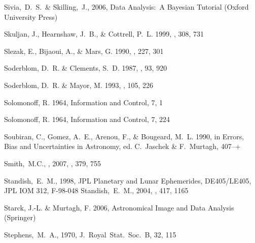 \begin{thebibliography}{99}
  Sivia,~D.~S.~\& Skilling,~J., 2006,
  Data Analysis:\ A Bayesian Tutorial (Oxford University Press)

{Skuljan}, J., {Hearnshaw}, J.~B., \& {Cottrell}, P.~L. 1999, \mnras, 308, 731

{Slezak}, E., {Bijaoui}, A., \& {Mars}, G. 1990, \aap, 227, 301

{Soderblom}, D.~R. \& {Clements}, S.~D. 1987, \aj, 93, 920

{Soderblom}, D.~R. \& {Mayor}, M. 1993, \aj, 105, 226

{Solomonoff}, R. 1964{}, {Information and Control}, 7, 1

{Solomonoff}, R. 1964{}, {Information and Control}, 7, 224

{Soubiran}, C., {Gomez}, A.~E., {Arenou}, F., \& {Bougeard}, M.~L. 1990, in
  Errors, Bias and Uncertainties in Astronomy, ed. C.~{Jaschek} \&
  F.~{Murtagh}, 407--+

  Smith,~M.C., \etal, 2007, \mnras, 379, 755

  Standish,~E.~M., 1998,
  JPL Planetary and Lunar Ephemerides, DE405/LE405,
  JPL IOM 312, F-98-048
  Standish,~E.~M., 2004,
  \aap, 417, 1165

{Starck}, J.-L. \& {Murtagh}, F. 2006, {Astronomical Image and Data Analysis}
  ({Springer})

  Stephens,~M.~A., 1970,
  J.~Royal~Stat.~Soc.~B, 32, 115


\end{thebibliography}
